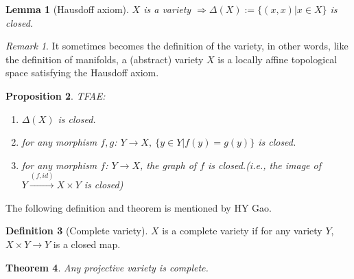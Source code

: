 \documentclass[a4paper]{article}
\newtheorem{thm}{Theorem}
\newtheorem{lemma}[thm]{Lemma}
\newtheorem{prop}[thm]{Proposition}
\theoremstyle{definition}
\newtheorem{defi}[thm]{Definition}
\theoremstyle{remark}
\newtheorem{rmk}{Remark}
\begin{document}
  \begin{lemma}
    [Hausdoff axiom] $X$ is a variety $\Rightarrow \Delta(X):=\{(x,x)|x\in X\}$ is closed.
  \end{lemma}
  \begin{rmk}
     It sometimes becomes the definition of the variety, in other words, like the definition of manifolds, a
     (abstract) variety $X$ is a locally affine topological space satisfying the Hausdoff axiom.
  \end{rmk}
  \begin{prop}TFAE:
    \begin{enumerate}[itemsep=0pt,parsep=0.2pt]
        \item $\Delta(X)$ is closed.
        \item for any morphism $f,g$: $Y\rightarrow X, \ \{y\in Y|f(y)=g(y)\}$ is closed.
        \item for any morphism $f$: $Y\rightarrow X$, the graph of $f$ is closed.(i.e., the image of \ $ Y\xrightarrow{(f,id)}X\times Y$ is closed)\vspace{2ex}
    \end{enumerate}
  \end{prop}

  The following definition and theorem is mentioned by HY Gao.

  \begin{defi}[Complete variety]
    $X$ is a complete variety if for any variety $Y$, $X\times Y \rightarrow Y$ is a closed map.
  \end{defi}
  \begin{thm}
    Any projective variety is complete.\vspace{2ex}
  \end{thm}
\end{document}
